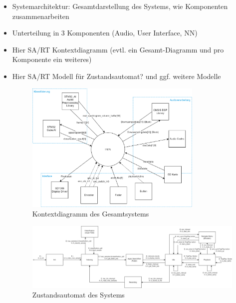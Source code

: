 \begin{itemize}
    \item Systemarchitektur: Gesamtdarstellung des Systems, wie Komponenten zusammenarbeiten
    \item Unterteilung in 3 Komponenten (Audio, User Interface, NN)
    \item Hier SA/RT Kontextdiagramm (evtl. ein Gesamt-Diagramm und pro Komponente ein weiteres)
    \item Hier SA/RT Modell für Zustandsautomat? und ggf. weitere Modelle
    
    \begin{figure}[H]
    	\centering
    	\includegraphics[width=0.8\textwidth]{images/04_spezifikation/kontextdiagramm_gesamt.drawio.png}
    	\caption{Kontextdiagramm des Gesamtsystems}
    	\label{fig:context_diagram_gesamt}
    \end{figure}
    
    
   
    
    \begin{figure}[H]
    	\centering
    	\includegraphics[width=1.0\textwidth]{images/04_spezifikation/fsm.drawio.png}
    	\caption{Zustandsautomat des Systems}
    	\label{fig:fsm}
    \end{figure}
    

\end{itemize}